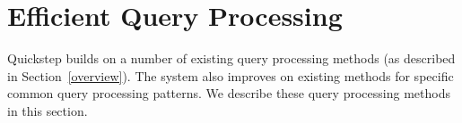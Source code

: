


\section{Efficient Query Processing} \label{sec:query-opt}





Quickstep builds on a number of existing query processing methods (as described in Section~\ref{overview}). The system also improves on existing methods for specific common query processing patterns. We describe these query processing methods in this section.

